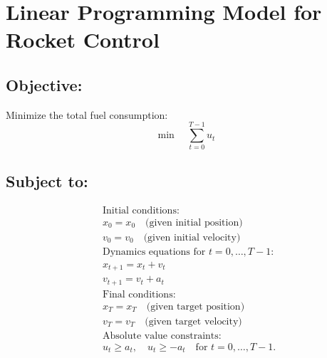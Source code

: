 \documentclass{article}
\begin{document}
\section*{Linear Programming Model for Rocket Control}

\subsection*{Objective:}

Minimize the total fuel consumption:
\[
\min \quad \sum_{t=0}^{T-1} u_t
\]

\subsection*{Subject to:}

\begin{align*}
& \text{Initial conditions:} \\
& x_0 = x_0 \quad \text{(given initial position)} \\
& v_0 = v_0 \quad \text{(given initial velocity)} \\

& \text{Dynamics equations for } t = 0, \ldots, T-1: \\
& x_{t+1} = x_t + v_t \\
& v_{t+1} = v_t + a_t \\

& \text{Final conditions:} \\
& x_T = x_T \quad \text{(given target position)} \\
& v_T = v_T \quad \text{(given target velocity)} \\

& \text{Absolute value constraints:} \\
& u_t \geq a_t, \quad u_t \geq -a_t \quad \text{for } t = 0, \ldots, T-1.
\end{align*}
\end{document}
